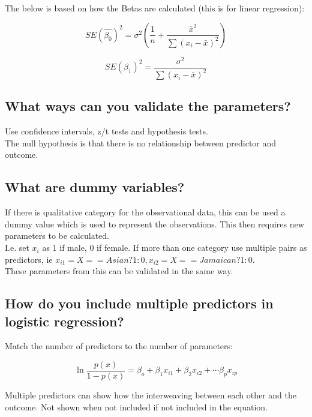 \documentclass[11pt]{scrartcl} %
\begin{document}
The below is based on how the Betas are calculated (this is for linear regression):

\begin{equation}
	SE(\hat{\beta_0})^2 = \sigma^2(\frac{1}{n} + \frac{\bar{x}^2}{\sum{(x_i-\bar{x})^2}})
\end{equation}

\begin{equation}
	SE(\beta_1)^2 = \frac{\sigma^2}{\sum{(x_i-\bar{x})^2}}
\end{equation}

\subsection{What ways can you validate the parameters?}

Use confidence intervals, z/t tests and hypothesis tests.\\

The null hypothesis is that there is no relationship between predictor and outcome.

\subsection{What are dummy variables?}

If there is qualitative category for the observational data, this can be used a dummy value which is used to represent
the observations. This then requires new parameters to be calculated.\\

I.e. set \(x_i\) as 1 if male, 0 if female. If more than one category use multiple pairs as predictors, ie 
\(x_{i1} = X==Asian?1:0, x_{i2} = X==Jamaican?1:0\).\\

These parameters from this can be validated in the same way.

\subsection{How do you include multiple predictors in logistic regression?}

Match the number of predictors to the number of parameters:

\begin{equation}
	\ln\frac{p(x)}{1-p(x)} = \beta_o + \beta_1x_{i1} + \beta_2x_{i2} + \cdots \beta_px_{ip}
\end{equation}

Multiple predictors can show how the interweaving between each other and the outcome. Not shown when not included if 
not included in the equation.\\
\end{document}
